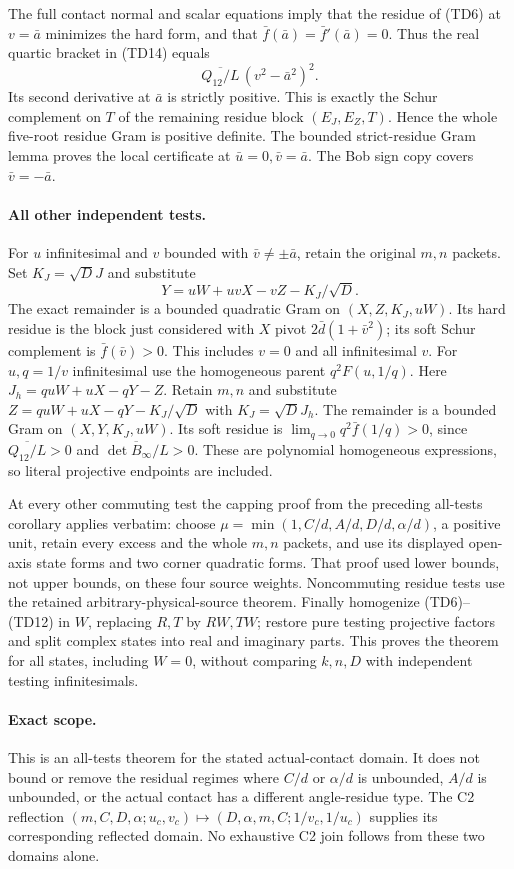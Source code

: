 The full contact normal and scalar equations imply that the residue
of (TD6) at $v=\bar a$ minimizes the hard form, and that
$\bar f(\bar a)=\bar f'(\bar a)=0$. Thus the real quartic bracket
in (TD14) equals
\[
 \overline{Q_{12}/L}\,(v^2-\bar a^2)^2.
\]
Its second derivative at $\bar a$ is strictly positive. This is
exactly the Schur complement on $T$ of the remaining residue block
$(E_J,E_Z,T)$. Hence the whole five-root residue Gram is positive
definite. The bounded strict-residue Gram lemma proves the local
certificate at $\bar u=0,\bar v=\bar a$. The Bob sign copy covers
$\bar v=-\bar a$.

\paragraph{All other independent tests.}
For $u$ infinitesimal and $v$ bounded with
$\bar v\ne\pm\bar a$, retain the original $m,n$ packets. Set
$K_J=\sqrt D J$ and substitute
\[
 Y=uW+uvX-vZ-K_J/\sqrt D.
\]
The exact remainder is a bounded quadratic Gram on
$(X,Z,K_J,uW)$. Its hard residue is the block just considered with
$X$ pivot $2\bar d(1+\bar v^2)$; its soft Schur complement is
$\bar f(\bar v)>0$. This includes $v=0$ and all infinitesimal $v$.
For $u,q=1/v$ infinitesimal use the homogeneous parent $q^2F(u,1/q)$.
Here $J_h=quW+uX-qY-Z$. Retain $m,n$ and substitute
$Z=quW+uX-qY-K_J/\sqrt D$ with $K_J=\sqrt D J_h$.
The remainder is a bounded Gram on $(X,Y,K_J,uW)$. Its soft residue
is $\lim_{q\to0}q^2\bar f(1/q)>0$, since
$\overline{Q_{12}/L}>0$ and
$\overline{\det B_\infty/L}>0$.
These are polynomial homogeneous expressions, so literal projective
endpoints are included.

At every other commuting test the capping proof from the preceding
all-tests corollary applies verbatim: choose
$\mu=\min(1,C/d,A/d,D/d,\alpha/d)$, a positive unit, retain every
excess and the whole $m,n$ packets, and use its displayed open-axis
state forms and two corner quadratic forms. That proof used lower
bounds, not upper bounds, on these four source weights. Noncommuting
residue tests use the retained arbitrary-physical-source theorem.
Finally homogenize (TD6)--(TD12) in $W$, replacing $R,T$ by $RW,TW$;
restore pure testing projective factors and split complex states into
real and imaginary parts. This proves the theorem for all states,
including $W=0$, without comparing $k,n,D$ with independent testing
infinitesimals.

\paragraph{Exact scope.}
This is an all-tests theorem for the stated actual-contact domain.
It does not bound or remove the residual regimes where $C/d$ or
$\alpha/d$ is unbounded, $A/d$ is unbounded, or the actual contact
has a different angle-residue type. The C2 reflection
$(m,C,D,\alpha;u_c,v_c)\mapsto(D,\alpha,m,C;1/v_c,1/u_c)$ supplies
its corresponding reflected domain. No exhaustive C2 join follows
from these two domains alone.

